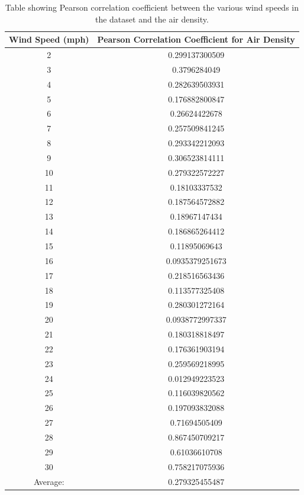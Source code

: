 \begin{table}[H]
\centering  %
\begin{tabular}{c c} %
Wind Speed (mph) & Pearson Correlation Coefficient for Air Density \\ [0.5ex] %
\hline                  %
2 & 0.299137300509 \\ \hline
3 & 0.3796284049 \\ \hline
4 & 0.282639503931 \\ \hline
5 & 0.176882800847 \\ \hline
6 & 0.26624422678 \\ \hline
7 & 0.257509841245 \\ \hline
8 & 0.293342212093 \\ \hline
9 & 0.306523814111 \\ \hline
10 & 0.279322572227  \\ \hline
11 & 0.18103337532 \\ \hline
12 & 0.187564572882 \\ \hline
13 & 0.18967147434 \\ \hline
14 & 0.186865264412 \\ \hline
15 & 0.11895069643 \\ \hline
16 & 0.0935379251673 \\ \hline
17 & 0.218516563436 \\ \hline
18 & 0.113577325408 \\ \hline
19 & 0.280301272164 \\ \hline
20 & 0.0938772997337 \\ \hline
21 & 0.180318818497 \\ \hline
22 & 0.176361903194 \\ \hline
23 & 0.259569218995 \\ \hline
24 & 0.012949223523 \\ \hline
25 & 0.116039820562 \\ \hline
26 & 0.197093832088 \\ \hline
27 & 0.71694505409 \\ \hline
28 & 0.867450709217 \\ \hline
29 & 0.61036610708 \\ \hline
30 & 0.758217075936 \\ \hline  
Average: & 0.279325455487 \\ [1ex] %
\hline %
\end{tabular}
\caption{Table showing Pearson correlation coefficient between the various wind speeds in the dataset and the air density.} %
\label{table:pearsonCoeficientAirDensity} %
\end{table}

